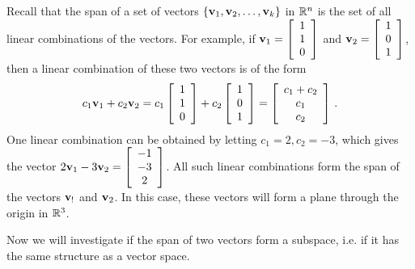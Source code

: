 Recall that the span of a set of vectors $\{\mathbf{v}_1, \mathbf{v}_2, \ldots, \mathbf{v}_k\}$ in $\mathbb{R}^n$ is the set of all linear combinations of the vectors. For example, if $\mathbf{v}_1=\left[ \begin{array}{c} 1\\1\\0\end{array} \right]$ and $\mathbf{v}_2=\left[ \begin{array}{c} 1\\0\\1\end{array} \right]$, then a linear combination of these two vectors is of the form
\[ c_1 \mathbf{v}_1 + c_2 \mathbf{v}_2 = c_1 \left[ \begin{array}{c} 1\\1\\0\end{array} \right] + c_2 \left[ \begin{array}{c} 1\\0\\1\end{array} \right] = \left[ \begin{array}{c} c_1+c_2 \\c_1 \\c_2 \end{array} \right] \,. \]
One linear combination can be obtained by letting $c_1=2, c_2=-3$, which gives the vector $2\mathbf{v}_1-3\mathbf{v}_2=\left[ \begin{array}{c} -1\\-3\\2\end{array} \right]$. All such linear combinations form the span of the vectors $\mathbf{v}_!$ and $\mathbf{v}_2$. In this case, these vectors will form a plane through the origin in $\mathbb{R}^3$. 

Now we will investigate if the span of two vectors form a subspace, i.e. if it has the same structure as a vector space.


